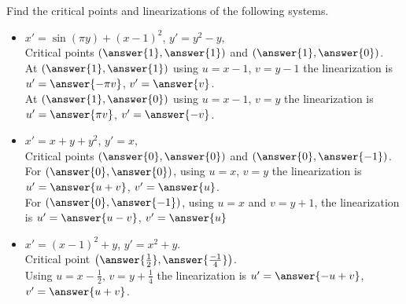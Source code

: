 \documentclass{ximera}
\begin{document}
\begin{exercise}%
    Find the critical points and linearizations of the following systems.
    \begin{itemize}
        \item $x'=\sin(\pi y)+(x-1)^2$, \enspace $y'=y^2-y$,\\
            Critical points $\left( \answer{1}, \answer{1} \right)$ and $\left( \answer{1}, \answer{0} \right)$.  \\
            At $\left( \answer{1}, \answer{1} \right)$ using $u = x - 1$, $v = y - 1$ the linearization is $u'= \answer{-\pi v}$, $v' = \answer{v}$.\\
            At $\left( \answer{1}, \answer{0} \right)$ using $u = x - 1$, $v = y$ the linearization is $u' = \answer{\pi v}$, $v' = \answer{-v}$.\\
        \item $x'=x+y+y^2$, \enspace $y'=x$,\\
            Critical points $\left( \answer{0},\answer{0} \right)$ and $\left(\answer{0}, \answer{-1} \right)$. \\
            For $\left( \answer{0}, \answer{0} \right)$, using $u=x$, $v=y$ the linearization is $u' = \answer{u + v}$, $v' = \answer{u}$. \\
            For $\left( \answer{0}, \answer{-1} \right)$, using $u = x$ and $v = y + 1$, the linearization is $u' = \answer{u - v}$, $v' = \answer{u}$\\
        \item $x'=(x-1)^2+y$, \enspace $y'=x^2+y$.\\
            Critical point $\left( \answer{\frac{1}{2}}, \answer{\frac{-1}{4}} \right)$. \\
            Using $u = x - \frac{1}{2}$, $v = y + \frac{1}{4}$ the linearization is $u' = \answer{-u + v}$, $v' = \answer{u + v}$.
    \end{itemize}
\end{exercise}
\end{document}
